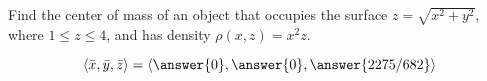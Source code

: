 \documentclass{ximera}
\author{David Guichard \and Neal Koblitz \and H. Jerome Keisler \and Albert Scheller \and Barry Balof \and Mike Wills \and Matthew Carr}
\begin{document}
\begin{exercise}




Find the center of mass of an object that occupies the surface $z=\sqrt{x^2+y^2}$, where $1\le z\le 4$, and has density $\rho(x,z)=x^2 z$. 

\begin{prompt}
\[
\vector{\bar{x},\bar{y},\bar{z}}=\vector{\answer{0},\answer{0},\answer{2275/682}}
\]
\end{prompt}


\end{exercise}
\end{document}
